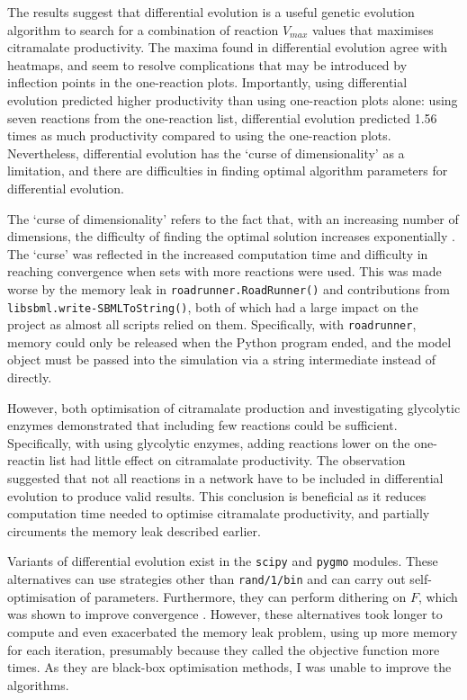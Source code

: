 \documentclass[parskip=full, numbers=noenddot]{scrreprt}
\begin{document}
The results suggest that differential evolution is a useful genetic evolution algorithm to search for a combination of reaction $V_{max}$ values that maximises citramalate productivity. The maxima found in differential evolution agree with heatmaps, and seem to resolve complications that may be introduced by inflection points in the one-reaction plots. Importantly, using differential evolution predicted higher productivity than using one-reaction plots alone: using seven reactions from the one-reaction list, differential evolution predicted 1.56 times as much productivity compared to using the one-reaction plots.
Nevertheless, differential evolution has the `curse of dimensionality' as a limitation, and there are difficulties in finding optimal algorithm parameters for differential evolution.

The `curse of dimensionality' refers to the fact that, with an increasing number of dimensions, the difficulty of finding the optimal solution increases exponentially \citep{mier_small_2017}. The `curse' was reflected in the increased computation time and difficulty in reaching convergence when sets with more reactions were used. This was made worse by the memory leak in \texttt{roadrunner.RoadRunner()} and contributions from \texttt{libsbml.write-SBMLToString()}, both of which had a large impact on the project as almost all scripts relied on them. Specifically, with \texttt{roadrunner}, memory could only be released when the Python program ended, and the model object must be passed into the simulation via a string intermediate instead of directly.

However, both optimisation of citramalate production and investigating glycolytic enzymes demonstrated that including few reactions could be sufficient. Specifically, with using glycolytic enzymes, adding reactions lower on the one-reactin list had little effect on citramalate productivity. The observation suggested that not all reactions in a network have to be included in differential evolution to produce valid results. This conclusion is beneficial as it reduces computation time needed to optimise citramalate productivity, and partially circuments the memory leak described earlier.

Variants of differential evolution exist in the \texttt{scipy} and \texttt{pygmo} modules. These alternatives can use strategies other than \texttt{rand/1/bin} and can carry out self-optimisation of parameters. Furthermore, they can perform dithering on $F$, which was shown to improve convergence \citep{storn_usage_1996}. However, these alternatives took longer to compute and even exacerbated the memory leak problem, using up more memory for each iteration, presumably because they called the objective function more times. As they are black-box optimisation methods, I was unable to improve the algorithms.
\end{document}
